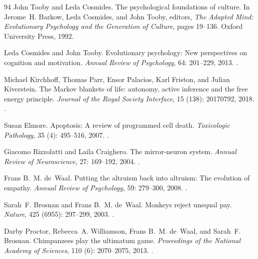 \documentclass[11pt]{article}
\theoremstyle{plain}
\theoremstyle{definition}
\theoremstyle{remark}
\begin{document}
\begin{thebibliography}{94}
John Tooby and Leda Cosmides.
\newblock The psychological foundations of culture.
\newblock In Jerome~H. Barkow, Leda Cosmides, and John Tooby, editors,
  \emph{The Adapted Mind: Evolutionary Psychology and the Generation of
  Culture}, pages 19--136. Oxford University Press, 1992.

Leda Cosmides and John Tooby.
\newblock Evolutionary psychology: New perspectives on cognition and
  motivation.
\newblock \emph{Annual Review of Psychology}, 64: 201--229, 2013.
\newblock {}.

Michael Kirchhoff, Thomas Parr, Ensor Palacios, Karl Friston, and Julian
  Kiverstein.
\newblock The {Markov} blankets of life: autonomy, active inference and the
  free energy principle.
\newblock \emph{Journal of the Royal Society Interface}, 15
  (138): 20170792, 2018.
\newblock {}.

Susan Elmore.
\newblock Apoptosis: A review of programmed cell death.
\newblock \emph{Toxicologic Pathology}, 35 (4): 495--516,
  2007.
\newblock {}.

Giacomo Rizzolatti and Laila Craighero.
\newblock The mirror-neuron system.
\newblock \emph{Annual Review of Neuroscience}, 27: 169--192, 2004.
\newblock {}.

Frans B.~M. de~Waal.
\newblock Putting the altruism back into altruism: The evolution of empathy.
\newblock \emph{Annual Review of Psychology}, 59: 279--300, 2008.
\newblock {}.

Sarah~F. Brosnan and Frans B.~M. de~Waal.
\newblock Monkeys reject unequal pay.
\newblock \emph{Nature}, 425 (6955): 297--299, 2003.
\newblock {}.

Darby Proctor, Rebecca~A. Williamson, Frans B.~M. de~Waal, and Sarah~F.
  Brosnan.
\newblock Chimpanzees play the ultimatum game.
\newblock \emph{Proceedings of the National Academy of Sciences}, 110
  (6): 2070--2075, 2013.
\newblock {}.


\end{thebibliography}
\end{document}
